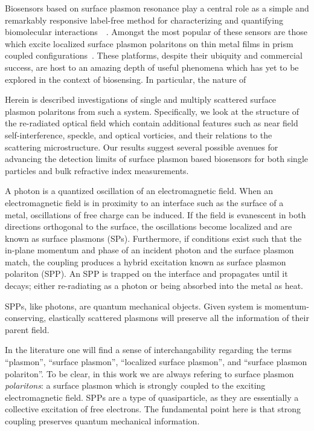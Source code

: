 Biosensors based on surface plasmon resonance play a central role as a
simple and remarkably responsive label-free method for characterizing and
quantifying biomolecular
interactions~\cite{homola1999surface}~\cite{homola2006surface}.  Amongst
the most popular of these sensors are those which excite localized surface
plasmon polaritons on thin metal films in prism coupled
configurations~\cite{hoa2007towards}.  These platforms, despite their
ubiquity and commercial success, are host to an amazing depth of useful
phenomena which has yet to be explored in the context of biosensing.  In
particular, the nature of 

Herein is described investigations of single and multiply scattered surface
plasmon polaritons from such a system.  Specifically, we look at the
structure of the re-radiated optical field which contain additional
features such as near field self-interference, speckle, and optical
vorticies, and their relations to the scattering microstructure.  Our
results suggest several possible avenues for advancing the detection limits
of surface plasmon based biosensors for both single particles and bulk
refractive index measurements.

A photon is a quantized oscillation of an electromagnetic field.  When an
electromagnetic  field is in proximity to an interface such as the surface
of a metal, oscillations of free charge can be induced.  If the field is
evanescent in both directions orthogonal to the surface, the oscillations
become localized and are known as surface plasmons (SPs).  Furthermore, if
conditions exist such that the in-plane momentum and phase of an incident
photon and the surface plasmon match, the coupling produces a hybrid
excitation known as surface plasmon polariton (SPP).  An SPP is trapped on
the interface and propagates until it decays; either re-radiating as a
photon or being absorbed into the metal as heat.

SPPs, like photons, are quantum mechanical objects.  Given system is
momentum-conserving, elastically scattered plasmons will preserve all the
information of their parent field.  

In the literature one will find a sense of interchangability regarding
the terms ``plasmon'', ``surface plasmon'', ``localized surface plasmon'',
and ``surface plasmon polariton''.  To be clear, in this work we are always
refering to surface plasmon \textit{polaritons}: a surface plasmon which is
strongly coupled to the exciting electromagnetic field.  SPPs are a type of
quasiparticle, as they are essentially a collective excitation of free
electrons.  The fundamental point here is that strong coupling preserves
quantum mechanical information.

